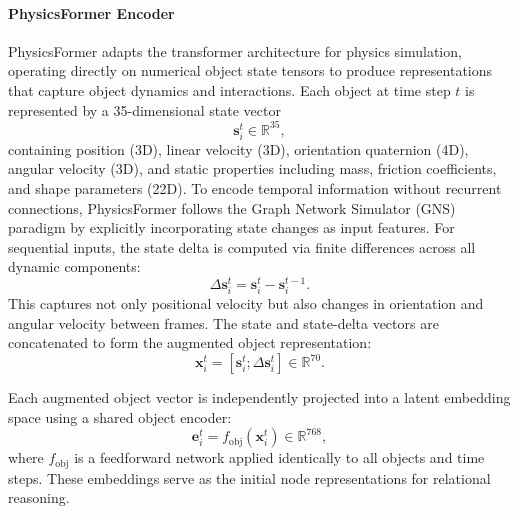 \documentclass[conference]{IEEEtran}
\theoremstyle{plain}
\theoremstyle{definition}
\theoremstyle{remark}
\begin{document}
\paragraph{PhysicsFormer Encoder}
PhysicsFormer adapts the transformer architecture \cite{vaswani2017attention} for physics simulation, operating directly on numerical object state tensors to produce representations that capture object dynamics and interactions.
Each object at time step $t$ is represented by a 35-dimensional state vector
\[
\mathbf{s}_i^t \in \mathbb{R}^{35},
\]
containing position (3D), linear velocity (3D), orientation quaternion (4D), angular velocity (3D), and static properties including mass, friction coefficients, and shape parameters (22D). To encode temporal information without recurrent connections, PhysicsFormer follows the Graph Network Simulator (GNS) paradigm \cite{sanchez2020learning} by explicitly incorporating state changes as input features.
For sequential inputs, the state delta is computed via finite differences across all dynamic components:
\[
\Delta\mathbf{s}_i^t = \mathbf{s}_i^t - \mathbf{s}_i^{t-1}.
\]
This captures not only positional velocity but also changes in orientation and angular velocity between frames. The state and state-delta vectors are concatenated to form the augmented object representation:
\begin{equation}
\mathbf{x}_i^t = \left[ \mathbf{s}_i^t ; \Delta\mathbf{s}_i^t \right] \in \mathbb{R}^{70}.
\label{eq:augmented_state}
\end{equation}

Each augmented object vector is independently projected into a latent embedding space using a shared object encoder:
\begin{equation}
\mathbf{e}_i^t = f_{\text{obj}}(\mathbf{x}_i^t) \in \mathbb{R}^{768},
\label{eq:object_embedding}
\end{equation}
where $f_{\text{obj}}$ is a feedforward network applied identically to all objects and time steps. These embeddings serve as the initial node representations for relational reasoning.
\end{document}
